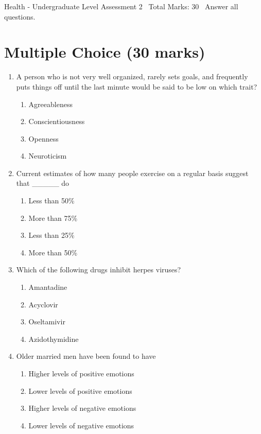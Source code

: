 \documentclass[12pt]{article}
\begin{document}
\begin{center}
Health - Undergraduate Level Assessment 2 \
Total Marks: 30 \
Answer all questions.
\end{center}

\section*{Multiple Choice (30 marks)}
\begin{enumerate}[label=\arabic*.]
\item A person who is not very well organized, rarely sets goals, and frequently puts things off until the last minute would be said to be low on which trait?
\begin{enumerate}[label=(\alph*)]
    \item Agreeableness
    \item Conscientiousness
    \item Openness
    \item Neuroticism
\end{enumerate}
\item Current estimates of how many people exercise on a regular basis suggest that \_\_\_\_\_ do
\begin{enumerate}[label=(\alph*)]
    \item Less than 50\%
    \item More than 75\%
    \item Less than 25\%
    \item More than 50\%
\end{enumerate}
\item Which of the following drugs inhibit herpes viruses?
\begin{enumerate}[label=(\alph*)]
    \item Amantadine
    \item Acyclovir
    \item Oseltamivir
    \item Azidothymidine
\end{enumerate}
\item Older married men have been found to have
\begin{enumerate}[label=(\alph*)]
    \item Higher levels of positive emotions
    \item Lower levels of positive emotions
    \item Higher levels of negative emotions
    \item Lower levels of negative emotions
\end{enumerate}

\end{enumerate}
\end{document}
